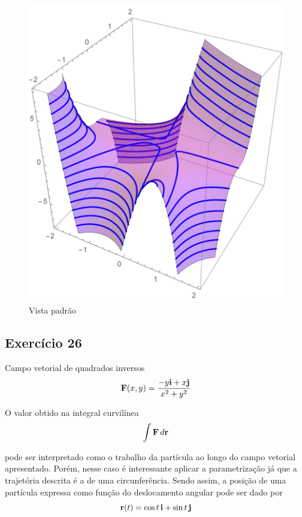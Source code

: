 \documentclass[a4paper, 12pt, brazilian]{article}
\begin{document}
	\begin{figure}[H]
		\centering
		\includegraphics[width=0.6\linewidth]{images/g153d2}
		\caption{Vista padrão}
	\end{figure}
	
	\subsection{Exercício 26}
	
	Campo vetorial de quadrados inversos
	\begin{equation}
		\textbf{F} (x,y)=\dfrac{-y\textbf{i}+x\textbf{j}}{x^{2}+y^{2}}
	\end{equation}
	
	O valor obtido na integral curvilínea 
	\begin{equation}
		\int\textbf{F}\,d\textbf{r}
	\end{equation}
	
	pode ser interpretado como o trabalho da partícula ao longo do campo vetorial apresentado. Porém, nesse caso é interessante aplicar a parametrização já que a trajetória descrita é a de uma circunferência. Sendo assim, a posição de uma partícula expressa como função do deslocamento angular pode ser dado por
	\begin{equation}
		\textbf{r}(t)=\cos t\,\textbf{i}+\sin t\,\textbf{j}
	\end{equation}
	
\end{document}
